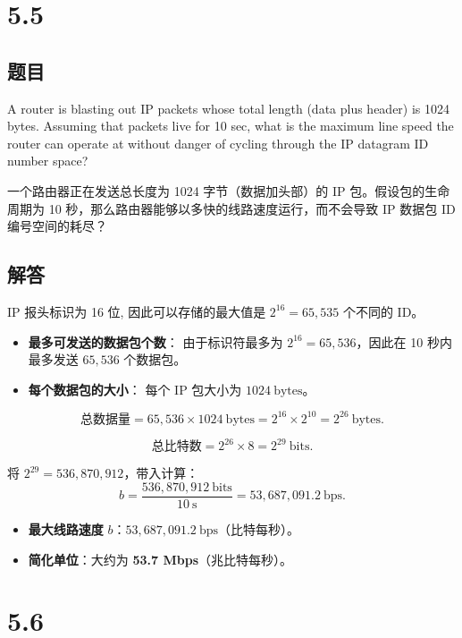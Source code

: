 \section{5.5}

\subsection*{题目}
A router is blasting out IP packets whose total length (data plus header) is 1024 bytes. Assuming that packets live for 10 sec, what is the maximum line speed the router can operate at without danger of cycling through the IP datagram ID number space?

一个路由器正在发送总长度为 1024 字节（数据加头部）的 IP 包。假设包的生命周期为 10 秒，那么路由器能够以多快的线路速度运行，而不会导致 IP 数据包 ID 编号空间的耗尽？

\subsection*{解答}

IP 报头标识为 16 位, 因此可以存储的最大值是 $ 2^{16} =65,535$ 个不同的 ID。

\begin{itemize}
  \item \textbf{最多可发送的数据包个数}：  
  由于标识符最多为 $2^{16} = 65,536$，因此在 10 秒内最多发送 $65,536$ 个数据包。
  
  \item \textbf{每个数据包的大小}：  
  每个 IP 包大小为 $1024 \ \text{bytes}$。
\end{itemize}

  \[
    \text{总数据量} = 65,536 \times 1024 \ \text{bytes} = 2^{16} \times 2^{10} = 2^{26} \ \text{bytes}.
  \]

  \[
    \text{总比特数} = 2^{26} \times 8 = 2^{29} \ \text{bits}.
  \]

将 $2^{29} = 536,870,912$，带入计算：
\[
b = \frac{536,870,912 \ \text{bits}}{10 \ \text{s}} = 53,687,091.2 \ \text{bps}.
\]

\begin{itemize}
    \item \textbf{最大线路速度} $b$：$53,687,091.2 \ \text{bps}$（比特每秒）。
    \item \textbf{简化单位}：大约为 \textbf{53.7 Mbps}（兆比特每秒）。
\end{itemize}

\section{5.6}

